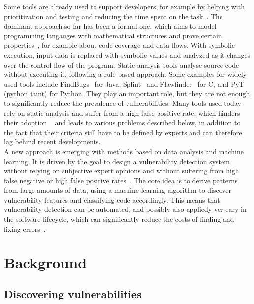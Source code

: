 \documentclass[
	a4paper,
	pagesize,
	pdftex,
	12pt,
	twoside, %
	BCOR=5mm, %
	ngerman,
	fleqn,
	final,
	]{scrartcl}
\begin{document}
Some tools are already used to support developers, for example by helping with prioritization and testing and reducing the time spent on the task~\cite{Dam.2017}. The dominant approach so far has been a formal one, which aims to model programming langauges with mathematical structures and prove certain properties~\cite{Allamanis.2018}, for example about code coverage and data flows. With symbolic execution, input data is replaced with symbolic values and analyzed as it changes over the control flow of the program. Static analysis tools analyse source code without executing it, following a rule-based approach. Some examples for widely used tools include FindBugs~\cite{Hovemeyer.2004,Hovemeyer.2005} for Java, Splint~\cite{Evans.2002} and Flawfinder~\cite{Wheeler.2006} for C, and PyT~\cite{Micheelsen.2016} (python taint) for Python. They play an important role, but they are not enough to significantly reduce the prevalence of vulnerabilities. Many tools used today rely on static analysis and suffer from a high false positive rate, which hinders their adoption ~\cite{Liu.2018} and leads to various problems described below, in addition to the fact that their criteria still have to be defined by experts and can therefore lag behind recent developments.\\

A new approach is emerging with methods based on data analysis and machine learning. It is driven by the goal to design a vulnerability detection system without relying on subjective expert opinions and without suffering from high false negative or high false positive rates~\cite{Li.2018}. The core idea is to derive patterns from large amounts of data, using a machine learning algorithm to discover vulnerability features and classifying code accordingly. This means that vulnerability detection can be automated, and possibly also appliedy ver eary in the software lifecycle, which can significantly reduce the costs of finding and fixing errors~\cite{Dam.2017}.


\section{Background}

\subsection{Discovering vulnerabilities}
\end{document}
